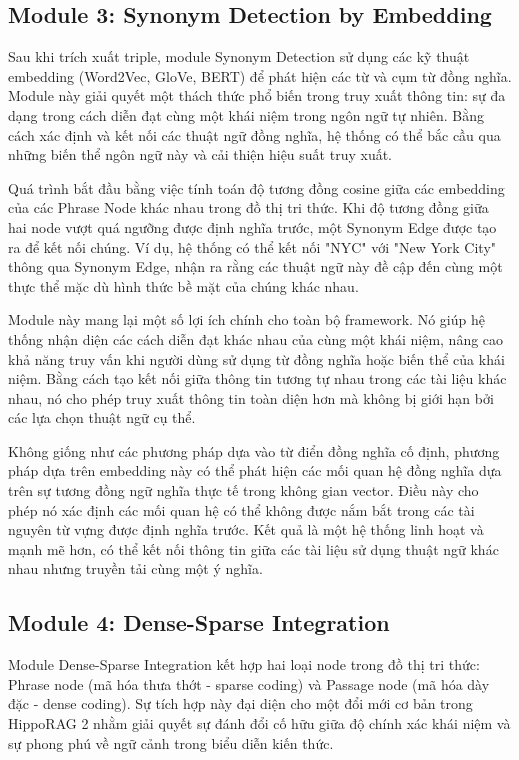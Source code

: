 \documentclass[../main.tex]{subfiles}
\begin{document}
\subsection{Module 3: Synonym Detection by Embedding}
Sau khi trích xuất triple, module Synonym Detection sử dụng các kỹ thuật embedding (Word2Vec, GloVe, BERT) để phát hiện các từ và cụm từ đồng nghĩa. Module này giải quyết một thách thức phổ biến trong truy xuất thông tin: sự đa dạng trong cách diễn đạt cùng một khái niệm trong ngôn ngữ tự nhiên. Bằng cách xác định và kết nối các thuật ngữ đồng nghĩa, hệ thống có thể bắc cầu qua những biến thể ngôn ngữ này và cải thiện hiệu suất truy xuất.

Quá trình bắt đầu bằng việc tính toán độ tương đồng cosine giữa các embedding của các Phrase Node khác nhau trong đồ thị tri thức. Khi độ tương đồng giữa hai node vượt quá ngưỡng được định nghĩa trước, một Synonym Edge được tạo ra để kết nối chúng. Ví dụ, hệ thống có thể kết nối "NYC" với "New York City" thông qua Synonym Edge, nhận ra rằng các thuật ngữ này đề cập đến cùng một thực thể mặc dù hình thức bề mặt của chúng khác nhau.

Module này mang lại một số lợi ích chính cho toàn bộ framework. Nó giúp hệ thống nhận diện các cách diễn đạt khác nhau của cùng một khái niệm, nâng cao khả năng truy vấn khi người dùng sử dụng từ đồng nghĩa hoặc biến thể của khái niệm. Bằng cách tạo kết nối giữa thông tin tương tự nhau trong các tài liệu khác nhau, nó cho phép truy xuất thông tin toàn diện hơn mà không bị giới hạn bởi các lựa chọn thuật ngữ cụ thể.

Không giống như các phương pháp dựa vào từ điển đồng nghĩa cố định, phương pháp dựa trên embedding này có thể phát hiện các mối quan hệ đồng nghĩa dựa trên sự tương đồng ngữ nghĩa thực tế trong không gian vector. Điều này cho phép nó xác định các mối quan hệ có thể không được nắm bắt trong các tài nguyên từ vựng được định nghĩa trước. Kết quả là một hệ thống linh hoạt và mạnh mẽ hơn, có thể kết nối thông tin giữa các tài liệu sử dụng thuật ngữ khác nhau nhưng truyền tải cùng một ý nghĩa.

\subsection{Module 4: Dense-Sparse Integration}
Module Dense-Sparse Integration kết hợp hai loại node trong đồ thị tri thức: Phrase node (mã hóa thưa thớt - sparse coding) và Passage node (mã hóa dày đặc - dense coding). Sự tích hợp này đại diện cho một đổi mới cơ bản trong HippoRAG 2 nhằm giải quyết sự đánh đổi cố hữu giữa độ chính xác khái niệm và sự phong phú về ngữ cảnh trong biểu diễn kiến thức.
\end{document}
